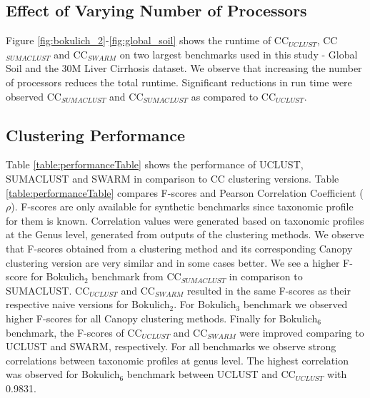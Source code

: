 \documentclass[10pt, conference, compsocconf]{IEEEtran}
\begin{document}

\subsection{\textbf{Effect of Varying Number of Processors}}
Figure \ref{fig:bokulich_2}-\ref{fig:global_soil} shows the runtime of CC$_{UCLUST}$, CC$_{SUMACLUST}$ and CC$_{SWARM}$ on two largest benchmarks used in this study - Global Soil and the 30M Liver Cirrhosis dataset. We observe that increasing the number of processors reduces the total runtime. Significant reductions in run time were observed CC$_{SUMACLUST}$ and CC$_{SUMACLUST}$ as 
compared to CC$_{UCLUST}$.  

\subsection{\textbf{Clustering Performance}}
Table \ref{table:performanceTable} shows the performance of  UCLUST, SUMACLUST and SWARM  in comparison to CC clustering versions. Table 
\ref{table:performanceTable} compares F-scores and Pearson Correlation Coefficient ($\rho$). F-scores 
are only available for synthetic 
benchmarks since taxonomic profile for them is known. Correlation values were generated 
based on taxonomic profiles at the 
Genus level, 
generated from outputs of the  clustering methods. We observe 
that F-scores obtained from a clustering method and its corresponding Canopy clustering version are very similar and in some 
cases better. We see a higher F-score for Bokulich$_2$ benchmark from CC$_{SUMACLUST}$ in comparison to SUMACLUST.  CC$_{UCLUST}$ and CC$_{SWARM}$ resulted in the 
same F-scores as their respective naive versions for Bokulich$_2$. For Bokulich$_3$ benchmark we observed higher F-scores for all Canopy 
clustering methods. Finally for Bokulich$_6$ benchmark, the 
F-scores of CC$_{UCLUST}$ and CC$_{SWARM}$ were improved comparing to UCLUST and SWARM, respectively.
%
For all benchmarks we observe strong correlations between taxonomic profiles at genus level. The highest correlation was observed for 
Bokulich$_6$ benchmark between UCLUST and CC$_{UCLUST}$ with 0.9831. 

\end{document}
